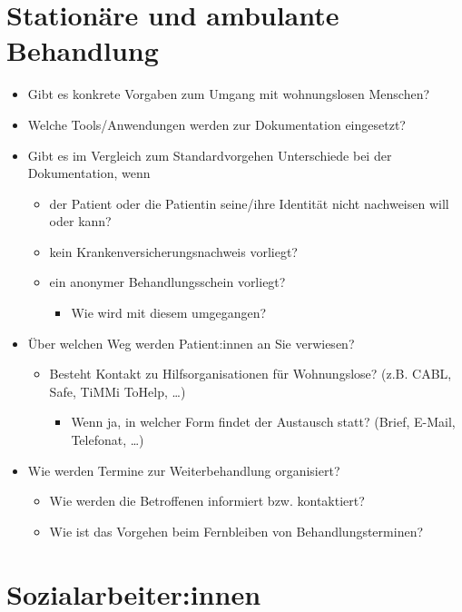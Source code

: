 \newpage

\section{Stationäre und ambulante Behandlung}

\begin{itemize}
	\item Gibt es konkrete Vorgaben zum Umgang mit wohnungslosen Menschen?
	\item Welche Tools/Anwendungen werden zur Dokumentation eingesetzt?
	\item Gibt es im Vergleich zum Standardvorgehen Unterschiede bei der Dokumentation, wenn
	\begin{itemize}
		\item der Patient oder die Patientin seine/ihre Identität nicht nachweisen will oder kann?
		\item kein Krankenversicherungsnachweis vorliegt?
		\item ein anonymer Behandlungsschein vorliegt?
		\begin{itemize}
			\item Wie wird mit diesem umgegangen?
		\end{itemize}
	\end{itemize}
	\item Über welchen Weg werden Patient:innen an Sie verwiesen?
	\begin{itemize}
		\item Besteht Kontakt zu Hilfsorganisationen für Wohnungslose? (z.B. CABL, Safe, TiMMi ToHelp, …)
		\begin{itemize}
			\item Wenn ja, in welcher Form findet der Austausch statt? (Brief, E-Mail, Telefonat, …)
		\end{itemize}
	\end{itemize}
	\item Wie werden Termine zur Weiterbehandlung organisiert?
	\begin{itemize}
		\item Wie werden die Betroffenen informiert bzw. kontaktiert?
		\item Wie ist das Vorgehen beim Fernbleiben von Behandlungsterminen?
	\end{itemize}
\end{itemize}

\newpage

\section{Sozialarbeiter:innen}

